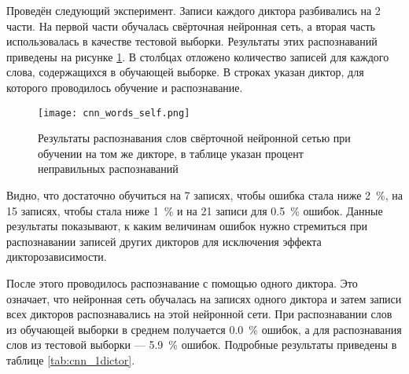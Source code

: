 Проведён следующий эксперимент.
Записи каждого диктора разбивались на 2 части.
На первой части обучалась свёрточная нейронная сеть, а вторая часть использовалась в качестве тестовой выборки.
Результаты этих распознаваний приведены на рисунке \ref{fig:cnn_words_self}.
В столбцах отложено количество записей для каждого слова, содержащихся в обучающей выборке.
В строках указан диктор, для которого проводилось обучение и распознавание.

\begin{figure}[h]
	\centering
	\texttt{[image: cnn\_words\_self.png]}
	\caption{Результаты распознавания слов свёрточной нейронной сетью при обучении на том же дикторе, в таблице указан процент неправильных распознаваний}
	\label{fig:cnn_words_self}
\end{figure}

Видно, что достаточно обучиться на 7 записях, чтобы ошибка стала ниже 2~\%, на 15 записях, чтобы стала ниже 1~\% и на 21 записи для 0.5~\% ошибок.
Данные результаты показывают, к каким величинам ошибок нужно стремиться при распознавании записей других дикторов для исключения эффекта дикторозависимости.

После этого проводилось распознавание с помощью одного диктора.
Это означает, что нейронная сеть обучалась на записях одного диктора и затем записи всех дикторов распознавались на этой нейронной сети.
При распознавании слов из обучающей выборки в среднем получается 0.0~\% ошибок, а для распознавания слов из тестовой выборки --- 5.9~\% ошибок.
Подробные результаты приведены в таблице \ref{tab:cnn_1dictor}.

